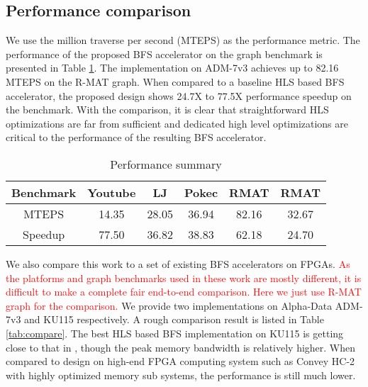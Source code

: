 \subsection{Performance comparison}
We use the million traverse per second (MTEPS) as 
the performance metric. The performance of the proposed BFS 
accelerator on the graph benchmark is 
presented in Table \ref{tab:performance-summary}. 
The implementation on ADM-7v3 achieves up to 
82.16 MTEPS on the R-MAT\uppercase\expandafter{} graph. 
When compared to a baseline HLS based 
BFS accelerator, the proposed design shows 24.7X to 77.5X performance 
speedup on the benchmark. 
With the comparison, it is clear that straightforward HLS optimizations 
are far from sufficient and dedicated high level optimizations are critical to 
the performance of the resulting BFS accelerator.
\begin{table}
	\vspace{-0.3em}
	\centering
	\caption{Performance summary}
	\vspace{-0.3em}
	\label{tab:performance-summary}
	\begin{tabular}{cccccc}
		\toprule
		Benchmark & Youtube & LJ & Pokec & RMAT\uppercase\expandafter{\romannumeral1} & RMAT\uppercase\expandafter{\romannumeral2} \\
		\midrule
		MTEPS & 14.35 & 28.05 & 36.94 & 82.16 & 32.67 \\
		Speedup & 77.50 & 36.82 & 38.83 & 62.18 & 24.70 \\
		\bottomrule
	\end{tabular}
	\vspace{-1em}
\end{table}



We also compare this work to a set of existing BFS accelerators on FPGAs. 
\textcolor{red}{As the platforms and graph benchmarks used in these work are mostly different, it is 
difficult to make a complete fair end-to-end comparison. 
Here we just use R-MAT graph for the comparison. }
We provide two implementations on Alpha-Data ADM-7v3 and KU115 respectively. A rough comparison result is listed 
in Table \ref{tab:compare}. The best HLS based BFS implementation on KU115 is 
getting close to that in \cite{zhang2017boosting}, though the peak memory bandwidth 
is relatively higher. When compared to design on high-end 
FPGA computing system such as Convey HC-2 with highly optimized memory sub systems, 
the performance is still much lower. 



